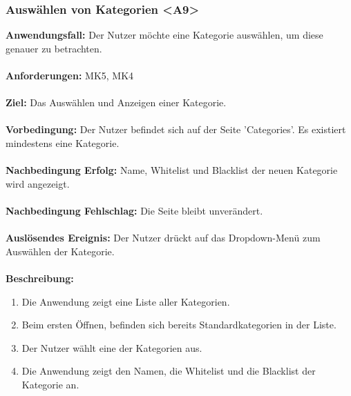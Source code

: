 \documentclass[parskip=full]{scrartcl} %
\begin{document}
\subsubsection*{Auswählen von Kategorien <A9>}
\textbf{Anwendungsfall:} Der Nutzer möchte eine Kategorie auswählen, um diese genauer zu betrachten.\\\\
\textbf{Anforderungen:} MK5, MK4\\\\
\textbf{Ziel:} Das Auswählen und Anzeigen einer Kategorie. \\\\
\textbf{Vorbedingung:} Der Nutzer befindet sich auf der Seite 'Categories'. Es existiert mindestens eine Kategorie. \\\\
\textbf{Nachbedingung Erfolg:} Name, Whitelist und Blacklist der neuen Kategorie wird angezeigt.\\\\
\textbf{Nachbedingung Fehlschlag:} Die Seite bleibt unverändert.\\\\
\textbf{Auslösendes Ereignis:} Der Nutzer drückt auf das Dropdown-Menü zum Auswählen der Kategorie. \\\\
\textbf{Beschreibung:}
\begin{enumerate}
    \item Die Anwendung zeigt eine Liste aller Kategorien.
    \item Beim ersten Öffnen, befinden sich bereits Standardkategorien in der Liste.
    \item Der Nutzer wählt eine der Kategorien aus.
    \item Die Anwendung zeigt den Namen, die Whitelist und die Blacklist der Kategorie an.
\end{enumerate}
\newpage
\end{document}
